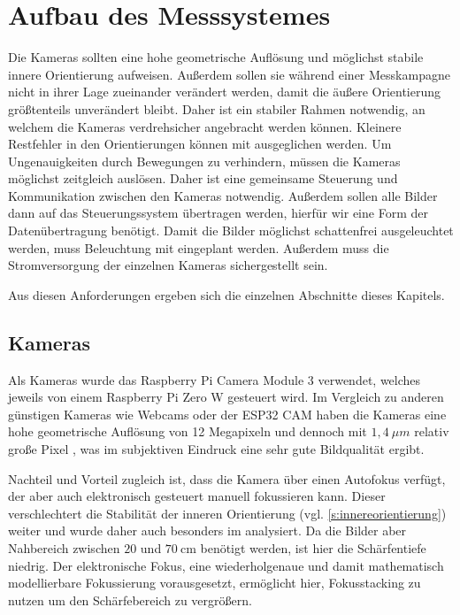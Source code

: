 \documentclass[./00PhotoBox.tex]{subfiles}
\begin{document}
\chapter{Aufbau des Messsystemes}
Die Kameras sollten eine hohe geometrische Auflösung und möglichst stabile innere Orientierung aufweisen. Außerdem sollen sie während einer Messkampagne nicht in ihrer Lage zueinander verändert werden, damit die äußere Orientierung größtenteils unverändert bleibt. Daher ist ein stabiler Rahmen notwendig, an welchem die Kameras verdrehsicher angebracht werden können. Kleinere Restfehler in den Orientierungen können mit ausgeglichen werden.
Um Ungenauigkeiten durch Bewegungen zu verhindern, müssen die Kameras möglichst zeitgleich auslösen. Daher ist eine gemeinsame Steuerung und Kommunikation zwischen den Kameras notwendig. Außerdem sollen alle Bilder dann auf das Steuerungssystem übertragen werden, hierfür wir eine Form der Datenübertragung benötigt. Damit die Bilder möglichst schattenfrei ausgeleuchtet werden, muss Beleuchtung mit eingeplant werden. Außerdem muss die Stromversorgung der einzelnen Kameras sichergestellt sein.

Aus diesen Anforderungen ergeben sich die einzelnen Abschnitte dieses Kapitels.

\section{Kameras}
Als Kameras wurde das Raspberry Pi Camera Module 3 verwendet, welches jeweils von einem Raspberry Pi Zero W gesteuert wird. Im Vergleich zu anderen günstigen Kameras wie Webcams oder der ESP32 CAM haben die Kameras eine hohe geometrische Auflösung von 12 Megapixeln und dennoch mit $1,4~\mu m$ relativ große Pixel \citep{raspi_cam_datasheet}, was im subjektiven Eindruck eine sehr gute Bildqualität ergibt.

Nachteil und Vorteil zugleich ist, dass die Kamera über einen Autofokus verfügt, der aber auch elektronisch gesteuert manuell fokussieren kann. Dieser verschlechtert die Stabilität der inneren Orientierung (vgl. \autoref{s:innereorientierung}) weiter und wurde daher auch besonders im  analysiert. Da die Bilder aber Nahbereich zwischen $20$ und $70~\text{cm}$ benötigt werden, ist hier die Schärfentiefe niedrig. Der elektronische Fokus, eine wiederholgenaue und damit mathematisch modellierbare Fokussierung vorausgesetzt, ermöglicht hier, Fokusstacking zu nutzen um den Schärfebereich zu vergrößern.
\end{document}
